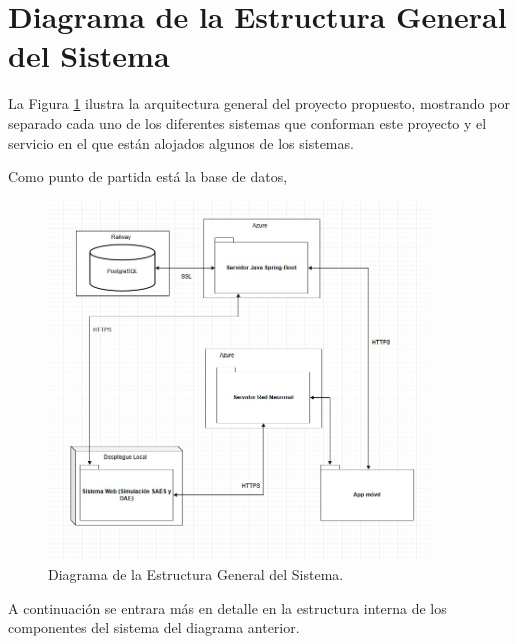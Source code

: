 \section{Diagrama de la Estructura General del Sistema} 
La Figura \ref{fig:Diagrama de sistemas} ilustra la arquitectura general del proyecto propuesto, mostrando por separado cada uno de los diferentes sistemas que conforman este proyecto y el servicio en el que están alojados algunos de los sistemas. 

Como punto de partida está la base de datos, 
\begin{figure}[htbp!]
	\begin{center}
		\includegraphics[width=0.9\textwidth]{images/DiagramaGeneralClases}
		\caption{Diagrama de la Estructura General del Sistema.}
		\label{fig:Diagrama de sistemas}
	\end{center}
\end{figure}

A continuación se entrara más en detalle en la estructura interna de los componentes del sistema del diagrama anterior.
